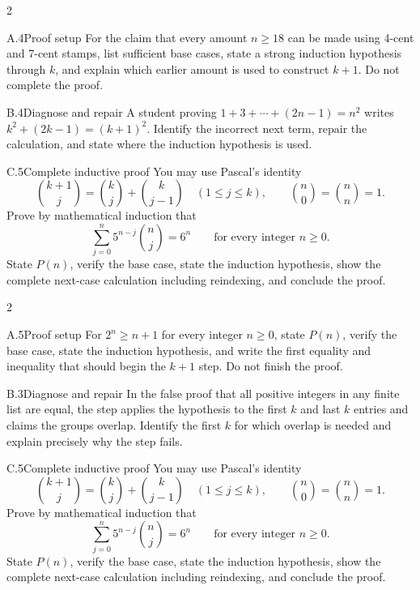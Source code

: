 \documentclass[9pt]{extarticle}
\begin{document}
\CoreWorkArea
\FormBreak
{}
\begin{multicols}{2}
\begin{CompactCoreProblem}{A.4}{Proof setup}
For the claim that every amount $n\ge18$ can be made using 4-cent and 7-cent stamps, list sufficient base cases, state a strong induction hypothesis through $k$, and explain which earlier amount is used to construct $k+1$. Do not complete the proof.
\end{CompactCoreProblem}
\begin{CompactCoreProblem}{B.4}{Diagnose and repair}
A student proving $1+3+\cdots+(2n-1)=n^2$ writes $k^2+(2k-1)=(k+1)^2$. Identify the incorrect next term, repair the calculation, and state where the induction hypothesis is used.
\end{CompactCoreProblem}
\end{multicols}
\begin{CompactCoreProblem}{C.5}{Complete inductive proof}
You may use Pascal's identity
\[
\binom{k+1}{j}=\binom{k}{j}+\binom{k}{j-1}
\quad(1\le j\le k),\qquad
\binom{n}{0}=\binom{n}{n}=1.
\]
Prove by mathematical induction that
\[
\sum_{j=0}^{n} 5^{n-j}\binom{n}{j}=6^n\qquad\text{for every integer }n\ge0.
\]
State $P(n)$, verify the base case, state the induction hypothesis, show the complete next-case calculation including reindexing, and conclude the proof.
\end{CompactCoreProblem}
\CoreWorkArea
\FormBreak
{}
\begin{multicols}{2}
\begin{CompactCoreProblem}{A.5}{Proof setup}
For $2^n\ge n+1$ for every integer $n\ge0$, state $P(n)$, verify the base case, state the induction hypothesis, and write the first equality and inequality that should begin the $k+1$ step. Do not finish the proof.
\end{CompactCoreProblem}
\begin{CompactCoreProblem}{B.3}{Diagnose and repair}
In the false proof that all positive integers in any finite list are equal, the step applies the hypothesis to the first $k$ and last $k$ entries and claims the groups overlap. Identify the first $k$ for which overlap is needed and explain precisely why the step fails.
\end{CompactCoreProblem}
\end{multicols}
\begin{CompactCoreProblem}{C.5}{Complete inductive proof}
You may use Pascal's identity
\[
\binom{k+1}{j}=\binom{k}{j}+\binom{k}{j-1}
\quad(1\le j\le k),\qquad
\binom{n}{0}=\binom{n}{n}=1.
\]
Prove by mathematical induction that
\[
\sum_{j=0}^{n} 5^{n-j}\binom{n}{j}=6^n\qquad\text{for every integer }n\ge0.
\]
State $P(n)$, verify the base case, state the induction hypothesis, show the complete next-case calculation including reindexing, and conclude the proof.
\end{CompactCoreProblem}
\end{document}
